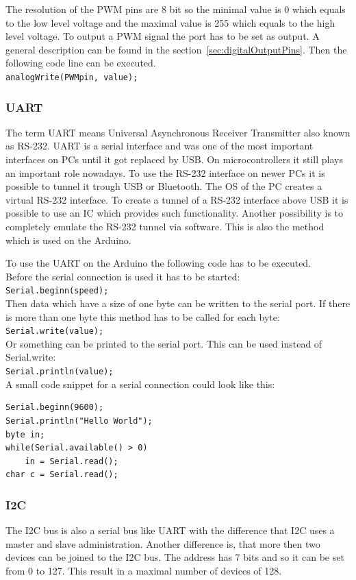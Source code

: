 The resolution of the PWM pins are 8 bit so the minimal value is 0 which equals to the low level voltage and the maximal value is 255 which equals to the high level voltage. 
To output a PWM signal the port has to be set as output. 
A general description can be found in the section~\ref{sec:digitalOutputPins}.
Then the following code line can be executed.\\
\lstinline|analogWrite(PWMpin, value);|


\subsubsection{UART}\label{sec:uart}
The term UART means Universal Asynchronous Receiver Transmitter also known as RS-232.
UART is a serial interface and was one of the most important interfaces on PCs until it got replaced by USB. On microcontrollers it still plays an important role nowadays.
To use the RS-232 interface on newer PCs it is possible to tunnel it trough USB or Bluetooth. 
The OS of the PC creates a virtual RS-232 interface.
To create a tunnel of a RS-232 interface above USB it is possible to use an IC which provides such functionality.
Another possibility is to completely emulate the RS-232 tunnel via software.
This is also the method which is used on the Arduino.

To use the UART on the Arduino the following code has to be executed.\\
Before the serial connection is used it has to be started: \\
\lstinline|Serial.beginn(speed);| \\
Then data which have a size of one byte can be written to the serial port.
If there is more than one byte this method has to be called for each byte: \\
\lstinline|Serial.write(value);| \\
Or something can be printed to the serial port. 
This can be used instead of Serial.write:\\
\lstinline|Serial.println(value);| \\

A small code snippet for a serial connection could look like this:\\
\begin{lstlisting}
Serial.beginn(9600);
Serial.println("Hello World");
byte in;
while(Serial.available() > 0)
	in = Serial.read();
char c = Serial.read();
\end{lstlisting}


\subsubsection{I2C}\label{sec:i2c}
The I2C bus is also a serial bus like UART with the difference that I2C uses a master and slave administration.
Another difference is, that more then two devices can be joined to the I2C bus.
The address has 7 bits and so it can be set from 0 to 127.
This result in a maximal number of devices of 128.

